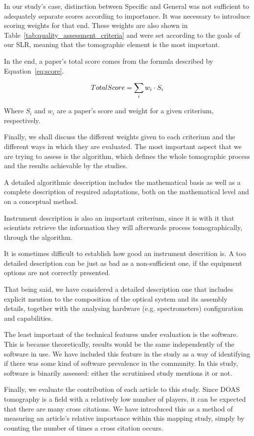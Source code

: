 In our study's case, distinction between Specific and General was not
sufficient to adequately separate scores according to importance. It was
necessary to introduce scoring weights for that end. These weights are
also shown in Table~\ref{tab:quality_assessment_criteria} and were set
according to the goals of our SLR, meaning that the tomographic element
is the most important.

In the end, a paper's total score comes from the formula described by
Equation~\ref{eq:score}.

\begin{equation}
    \centering
    \label{eq:score}
    Total Score = \sum_{i} w_{i} \cdot S_{i}
\end{equation}

Where $S_i$ and $w_i$ are a paper's score and weight for a given
criterium, respectively.

Finally, we shall discuss the different weights given to each criterium
and the different ways in which they are evaluated. The most important
aspect that we are trying to assess is the algorithm, which defines the
whole tomographic process and the results achievable by the studies.

A detailed algorithmic description includes the mathematical basis as
well as a complete description of required adaptations, both on the
mathematical level and on a conceptual method.

Instrument description is also an important criterium, since it is with
it that scientists retrieve the information they will afterwards process
tomographically, through the algorithm.

It is sometimes difficult to establish how good an instrument descrition
is. A too detailed description can be just as bad as a non-sufficient
one, if the equipment options are not correctly presented.

That being said, we have considered a detailed description one that
includes explicit mention to the composition of the optical system and
its assembly details, together with the analysing hardware (e.g.
spectrometers) configuration and capabilities.

The least important of the technical features under evaluation is the
software. This is because theoretically, results would be the same
independently of the software in use. We have included this feature in
the study as a way of identifying if there was some kind of software
prevalence in the community. In this study, software is binarily
assessed: either the scrutinised study mentions it or not.

Finally, we evaluate the contribution of each article to this study.
Since DOAS tomography is a field with a relatively low number of
players, it can be expected that there are many cross citations. We have
introduced this as a method of measuring an article's relative
importance within this mapping study, simply by counting the number of
times a cross citation occurs.
